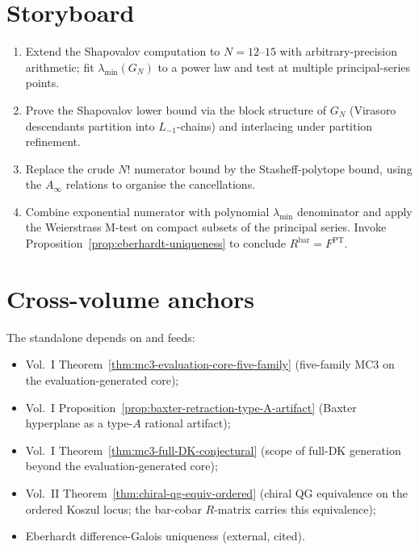 \documentclass[11pt]{amsart}
\theoremstyle{definition}
\theoremstyle{remark}
\providecommand{\Ainf}{A_\infty}
\begin{document}
\section{Storyboard}

\begin{enumerate}[nosep]
\item Extend the Shapovalov computation to $N = 12$--$15$ with
arbitrary-precision arithmetic; fit $\lambda_{\min}(G_N)$ to a power
law and test at multiple principal-series points.
\item Prove the Shapovalov lower bound via the block structure of
$G_N$ (Virasoro descendants partition into $L_{-1}$-chains) and
interlacing under partition refinement.
\item Replace the crude $N!$ numerator bound by the Stasheff-polytope
bound, using the $\Ainf$ relations to organise the cancellations.
\item Combine exponential numerator with polynomial $\lambda_{\min}$
denominator and apply the Weierstrass M-test on compact subsets of
the principal series. Invoke
Proposition~\ref{prop:eberhardt-uniqueness} to conclude
$R^{\mathrm{bar}} = F^{\mathrm{PT}}$.
\end{enumerate}

\section{Cross-volume anchors}

The standalone depends on and feeds:
\begin{itemize}[nosep]
\item Vol.~I Theorem~\ref*{thm:mc3-evaluation-core-five-family}
(five-family MC3 on the evaluation-generated core);
\item Vol.~I Proposition~\ref*{prop:baxter-retraction-type-A-artifact}
(Baxter hyperplane as a type-$A$ rational artifact);
\item Vol.~I Theorem~\ref*{thm:mc3-full-DK-conjectural} (scope of
full-DK generation beyond the evaluation-generated core);
\item Vol.~II Theorem~\ref*{thm:chiral-qg-equiv-ordered} (chiral QG
equivalence on the ordered Koszul locus; the bar-cobar $R$-matrix
carries this equivalence);
\item Eberhardt difference-Galois uniqueness (external, cited).
\end{itemize}
\end{document}
